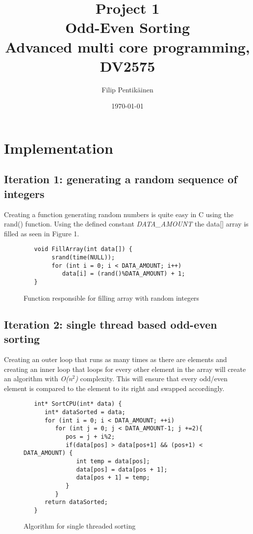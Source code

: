 \documentclass[a4paper,11pt]{article}
\begin{document}
\title{Project 1 \\ Odd-Even Sorting \\ 
Advanced multi core programming, DV2575}
\author{Filip Pentikäinen}
\date{\today}
\maketitle

\tableofcontents
\newpage

\section{Implementation}
\subsection{Iteration 1: generating a random sequence of integers}
Creating a function generating random numbers is quite easy in C using the rand() function. Using the defined constant \textit{DATA\_AMOUNT} the data[] array is filled as seen in Figure 1.
\begin{figure}[ht]
\begin{lstlisting}
   void FillArray(int data[]) {
	    srand(time(NULL));
	    for (int i = 0; i < DATA_AMOUNT; i++)
	       data[i] = (rand()%DATA_AMOUNT) + 1;
   }
\end{lstlisting}
\caption{Function responsible for filling array with random integers}
\end{figure}


\subsection{Iteration 2: single thread based odd-even sorting}
Creating an outer loop that runs as many times as there are elements and creating an inner loop that loops for every other element in the array will create an algorithm with \textit{O(n$^2$)} complexity.
This will ensure that every odd/even element is compared to the element to its right and swapped accordingly.

\begin{figure}[ht]
\begin{lstlisting}
   int* SortCPU(int* data) {
      int* dataSorted = data;
      for (int i = 0; i < DATA_AMOUNT; ++i)
         for (int j = 0; j < DATA_AMOUNT-1; j +=2){
            pos = j + i%2;
            if(data[pos] > data[pos+1] && (pos+1) < DATA_AMOUNT) {
               int temp = data[pos];
               data[pos] = data[pos + 1];
               data[pos + 1] = temp;
            }
         }
      return dataSorted;
   }
\end{lstlisting}
\caption{Algorithm for single threaded sorting}
\end{figure}
\end{document}
